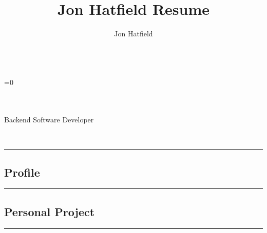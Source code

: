 \documentclass[10pt,letterpaper]{article}
\author{Jon Hatfield}
\title{Jon Hatfield Resume}
\begin{document}
\begin{center}
    {\huge \textbf{}}
    \\
    \ifnum{}=0
         \ \textbullet \ \ 
        \\
    \else
        \ \textbullet \ \ %
        \\
    \fi

    \\
    {\large Backend Software Developer \ \ \textbullet \ \ }
\end{center}

\begin{center}
    {\large
    
    \\}
\end{center}

\hrule
\vspace{-0.4em}
\subsection*{Profile}




\hrule
\vspace{-0.4em}
\subsection*{Personal Project}

\begin{itemize}

    \begin{samepage}
    \item
        
    \end{samepage}
\end{itemize}


\hrule
\vspace{-0.4em}
\end{document}
